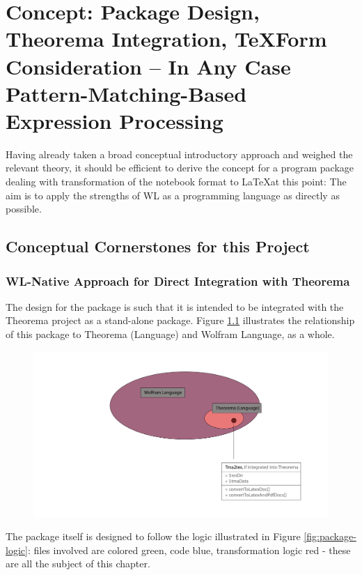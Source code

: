 \chapter[Concept]{Concept: Package Design, Theorema Integration, TeXForm Consideration – In Any Case Pattern-Matching-Based Expression Processing}
\label{cha:Concept}

Having already taken a broad conceptual introductory approach and weighed the relevant theory, it should be efficient to derive the concept for a program package dealing with transformation of the notebook format to \LaTeX at this point: The aim is to apply the strengths of WL as a programming language as directly as possible.

\section{Conceptual Cornerstones for this Project}

\subsection{WL-Native Approach for Direct Integration with Theorema}

The design for the package is such that it is intended to be integrated with the Theorema project as a stand-alone package. Figure \ref{fig:hierary} illustrates the relationship of this package to Theorema (Language) and Wolfram Language, as a whole.

\begin{figure}[h]
    \centering
    \includegraphics[scale=.35]{images/concept/Tma2Tex-Hierarchy.png}
    \caption{}
    \label{fig:hierary}
\end{figure}

The package itself is designed to follow the logic illustrated in Figure \ref{fig:package-logic}: files involved are colored green, code blue, transformation logic red - these are all the subject of this chapter.

